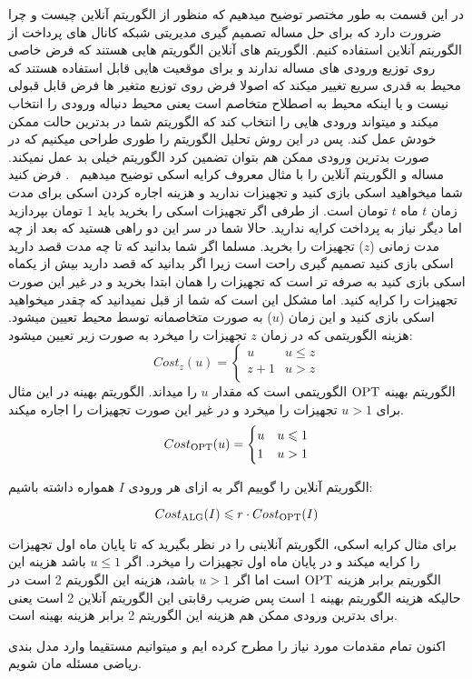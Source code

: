 در این قسمت به طور مختصر توضیح میدهیم که منظور از الگوریتم آنلاین چیست و چرا ضرورت دارد که برای حل مساله تصمیم گیری مدیریتی شبکه کانال های پرداخت از الگوریتم آنلاین استفاده کنیم. 
الگوریتم های آنلاین الگوریتم هایی هستند که فرض خاصی روی توزیع ورودی های مساله ندارند و برای موقعیت هایی قابل استفاده هستند که محیط به قدری سریع تغییر میکند که اصولا فرض روی توزیع متغیر ها فرض قابل قبولی نیست و یا اینکه محیط به اصطلاح متخاصم  است یعنی محیط دنباله ورودی را انتخاب میکند و میتواند ورودی هایی را انتخاب کند که الگوریتم شما در بدترین حالت ممکن خودش عمل کند. پس در این روش تحلیل الگوریتم را طوری طراحی میکنیم که در صورت بدترین ورودی ممکن هم بتوان تضمین کرد الگوریتم خیلی بد عمل نمیکند.
 مساله و الگوریتم آنلاین را با مثال معروف کرایه اسکی  توضیح میدهیم
~\cite{onlineTutorial}.
فرض کنید شما میخواهید اسکی بازی کنید و تجهیزات ندارید و هزینه اجاره کردن اسکی برای مدت زمان $t$ ماه $t$ تومان است. از طرفی اگر تجهیزات اسکی را بخرید باید 1 تومان بپردازید اما دیگر نیاز به پرداخت کرایه ندارید. حالا شما در سر این دو راهی هستید که بعد از چه مدت زمانی ($z$) تجهیزات را بخرید. مسلما اگر شما بدانید که تا چه مدت قصد دارید اسکی بازی کنید تصمیم گیری راحت است زیرا اگر بدانید که قصد دارید بیش از یکماه اسکی بازی کنید به صرفه تر است که تجهیزات را همان ابتدا بخرید و در غیر این صورت تجهیزات را کرایه کنید. 
اما مشکل این است که شما از قبل نمیدانید که چقدر میخواهید اسکی بازی کنید و این زمان  ($u$) به صورت متخاصمانه توسط محیط تعیین میشود.  هزینه الگوریتمی که در زمان $z$ تجهیزات را میخرد به صورت زیر تعیین میشود:
\begin{equation}
 Cost_z(u)=
    \begin{cases}
      u &  u \leq z\\
      z+1 & u > z\\
    \end{cases}       
\end{equation}
الگوریتم بهینه $\mathrm{OPT}$ الگوریتمی است که مقدار $u$ را میداند. الگوریتم بهینه در این مثال برای 
$u > 1$
تجهیزات را میخرد و در غیر این صورت تجهیزات را اجاره میکند.
\begin{equation}
 Cost_{\mathrm{OPT}}(u)=
    \begin{cases}
      u &  u \leqslant 1\\
      1 & u > 1\\
    \end{cases}       
\end{equation}

\begin{تعریف}
الگوریتم آنلاین \ALG
را  گوییم اگر به ازای هر ورودی $I$ همواره داشته باشیم:

$$Cost_{\mathrm{ALG}}(I) \leqslant r \cdot Cost_{\mathrm{OPT}}(I) $$
\end{تعریف}
برای مثال کرایه اسکی، الگوریتم آنلاینی را در نظر بگیرید که تا پایان ماه اول تجهیزات را کرایه میکند و در پایان ماه اول تجهیزات را میخرد. اگر
$u \leq 1$
باشد هزینه این الگوریتم برابر هزینه 
$\mathrm{OPT}$
است اما اگر
$u > 1$
باشد، هزینه این الگوریتم 2 است در حالیکه هزینه الگوریتم بهینه 1 است پس ضریب رقابتی این الگوریتم آنلاین 2 است یعنی برای بدترین ورودی ممکن هم هزینه این الگوریتم 2 برابر هزینه بهینه است.

اکنون تمام مقدمات مورد نیاز را مطرح کرده ایم و میتوانیم مستقیما وارد مدل بندی ریاضی مسئله مان شویم.










